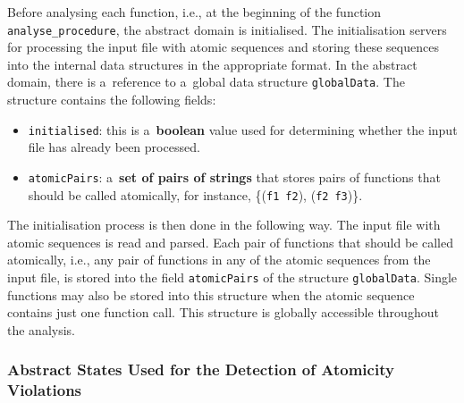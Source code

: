 Before analysing each function, i.e., at the beginning of the function
\texttt{analyse\_procedure}, the abstract domain is initialised. The
initialisation servers for processing the input file with atomic sequences
and storing these sequences into the internal data structures in the
appropriate format. In the abstract domain, there is a~reference to
a~global data structure \texttt{globalData}. The structure contains the
following fields:
\begin{itemize}
    \item
        \texttt{initialised}: this is a~\textbf{boolean} value used for
        determining whether the input file has already been
        processed.

    \item
        \texttt{atomicPairs}: a~\textbf{set of pairs of strings} that
        stores pairs of functions that should be called
        atomically, for instance, \{(\texttt{f1}~\texttt{f2}),
        (\texttt{f2}~\texttt{f3})\}.
\end{itemize}

The initialisation process is then done in the following way. The input file
with atomic sequences is read and parsed. Each pair of functions that should
be called atomically, i.e., any pair of functions in any of the atomic
sequences from the input file, is stored into the field \texttt{atomicPairs}
of the structure \texttt{globalData}. Single functions may also be stored
into this structure when the atomic sequence contains just one function call.
This structure is globally accessible throughout the analysis.

\subsubsection{%
    Abstract States Used for the Detection of Atomicity Violations
}

